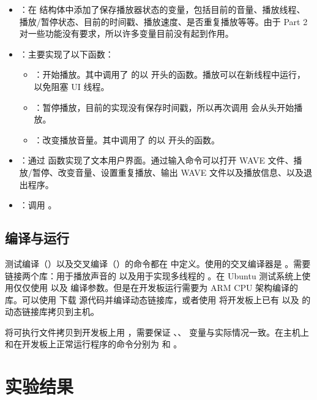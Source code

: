 \begin{itemize}
    \item {}：在  结构体中添加了保存播放器状态的变量，包括目前的音量、播放线程、播放/暂停状态、目前的时间戳、播放速度、是否重复播放等等。由于 Part 2 对一些功能没有要求，所以许多变量目前没有起到作用。
    \item {}：主要实现了以下函数：
    \begin{itemize}
        \item {}：开始播放。其中调用了  的以  开头的函数。播放可以在新线程中运行，以免阻塞 UI 线程。
        \item {}：暂停播放，目前的实现没有保存时间戳，所以再次调用  会从头开始播放。
        \item {}：改变播放音量。其中调用了  的以  开头的函数。
    \end{itemize}
    \item {}：通过  函数实现了文本用户界面。通过输入命令可以打开 WAVE 文件、播放/暂停、改变音量、设置重复播放、输出 WAVE 文件以及播放信息、以及退出程序。
    \item {}：调用 。
\end{itemize}

\subsection{编译与运行}

测试编译（）以及交叉编译（）的命令都在  中定义。使用的交叉编译器是 。需要链接两个库：用于播放声音的  以及用于实现多线程的 。在 Ubuntu 测试系统上使用仅仅使用  以及  编译参数。但是在开发板运行需要为 ARM CPU 架构编译的库。可以使用  下载  源代码并编译动态链接库，或者使用  将开发板上已有  以及  的动态链接库拷贝到主机。

将可执行文件拷贝到开发板上用 ，需要保证 、、 变量与实际情况一致。在主机上和在开发板上正常运行程序的命令分别为  和 。

\section{实验结果}


